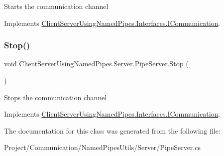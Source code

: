 Starts the communication channel 



Implements \hyperlink{interface_client_server_using_named_pipes_1_1_interfaces_1_1_i_communication_ac06ad36a2b8a02d82e385e0eade28671}{Client\+Server\+Using\+Named\+Pipes.\+Interfaces.\+I\+Communication}.

\mbox{\label{class_client_server_using_named_pipes_1_1_server_1_1_pipe_server_a37eb41a1b69ab108b9eb5745950b3ab9}} 
\subsubsection{\texorpdfstring{Stop()}{Stop()}}
{\footnotesize\ttfamily void Client\+Server\+Using\+Named\+Pipes.\+Server.\+Pipe\+Server.\+Stop (\begin{DoxyParamCaption}{ }\end{DoxyParamCaption})\hspace{0.3cm}{\ttfamily [inline]}}



Stops the communication channel 



Implements \hyperlink{interface_client_server_using_named_pipes_1_1_interfaces_1_1_i_communication_a85ce939996cde20d398e799ca6a900f3}{Client\+Server\+Using\+Named\+Pipes.\+Interfaces.\+I\+Communication}.



The documentation for this class was generated from the following file\+:\begin{DoxyCompactItemize}
\item 
Project/\+Communication/\+Named\+Pipes\+Utils/\+Server/Pipe\+Server.\+cs\end{DoxyCompactItemize}
